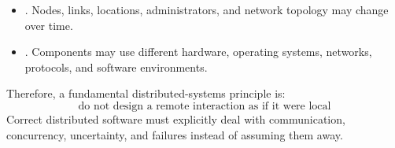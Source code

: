 \begin{takeawaysbox}
\begin{itemize}
        \item {}.
            Nodes, links, locations, administrators, and network topology may
            change over time.

        \item {}.
            Components may use different hardware, operating systems, networks,
            protocols, and software environments.

    \end{itemize}
    Therefore, a fundamental distributed-systems principle is:
    \begin{equation*}
        \boxed{
            \text{do not design a remote interaction as if it were local}
        }
    \end{equation*}
    Correct distributed software must explicitly deal with communication,
    concurrency, uncertainty, and failures instead of assuming them away.
\end{takeawaysbox}